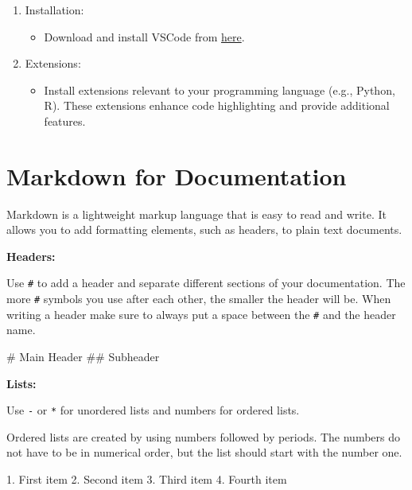 \documentclass[
  letterpaper,
  DIV=11,
  numbers=noendperiod]{scrreprt}
\newenvironment{Shaded}{}{}
\newcommand{\FunctionTok}[1]{\textcolor[rgb]{0.44,0.26,0.76}{#1}}
\newcommand{\NormalTok}[1]{\textcolor[rgb]{0.14,0.16,0.18}{#1}}
\newcommand{\SpecialStringTok}[1]{\textcolor[rgb]{0.01,0.18,0.38}{#1}}
\providecommand{\tightlist}{%
  \setlength{\itemsep}{0pt}\setlength{\parskip}{0pt}}
\begin{document}
\begin{enumerate}
\def\labelenumi{\arabic{enumi}.}
\tightlist
\item
  Installation:

  \begin{itemize}
  \tightlist
  \item
    Download and install VSCode from
    \href{https://code.visualstudio.com/}{here}.
  \end{itemize}
\item
  Extensions:

  \begin{itemize}
  \tightlist
  \item
    Install extensions relevant to your programming language (e.g.,
    Python, R). These extensions enhance code highlighting and provide
    additional features.
  \end{itemize}
\end{enumerate}

\section{Markdown for Documentation}\label{markdown-for-documentation}

Markdown is a lightweight markup language that is easy to read and
write. It allows you to add formatting elements, such as headers, to
plain text documents.

\textbf{Headers:}

Use \texttt{\#} to add a header and separate different sections of your
documentation. The more \texttt{\#} symbols you use after each other,
the smaller the header will be. When writing a header make sure to
always put a space between the \texttt{\#} and the header name.

\begin{Shaded}
\begin{Highlighting}[]
\FunctionTok{\# Main Header}
\FunctionTok{\#\# Subheader}
\end{Highlighting}
\end{Shaded}

\textbf{Lists:}

Use \texttt{-} or \texttt{*} for unordered lists and numbers for ordered
lists.

Ordered lists are created by using numbers followed by periods. The
numbers do not have to be in numerical order, but the list should start
with the number one.

\begin{Shaded}
\begin{Highlighting}[]
\SpecialStringTok{1. }\NormalTok{First item}
\SpecialStringTok{2. }\NormalTok{Second item}
\SpecialStringTok{3. }\NormalTok{Third item}
\SpecialStringTok{4. }\NormalTok{Fourth item }
\end{Highlighting}
\end{Shaded}
\end{document}
